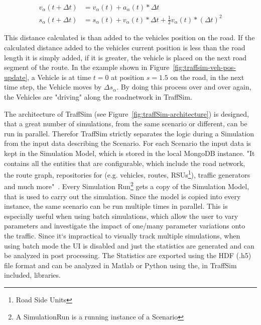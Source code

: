             \begin{align}
                v_{\alpha}(t + \Delta t) &= v_{\alpha}(t) + a_\alpha(t) * \Delta t \label{eq:numerical-integration-v} \\
                s_{\alpha}(t + \Delta t) &= s_{\alpha}(t) + v_{\alpha}(t) * \Delta t + \frac{1}{2} v_{\alpha}(t) * (\Delta t)^2 \label{eq:numerical-integration-s}
            \end{align}

            This distance calculated is than added to the vehicles position on the road.
            If the calculated distance added to the vehicles current position is less than the road length it is simply added, if it is greater, the vehicle is placed on the next road segment of the route.
            In the example shown in Figure~\ref{fig:traffsim-veh-pos-update}, a Vehicle is at time $t=0$ at position $s=1.5$ on the road, in the next time step, the Vehicle moves by $\Delta s_\alpha$.
            By doing this process over and over again, the Vehicles are "driving" along the roadnetwork in TraffSim.


            The architecture of TraffSim (see Figure~\ref{fig:traffSim-architecture}) is designed, that a great number of simulations, from the same scenario or different, can be run in parallel.
            Therefor TraffSim strictly separates the logic during a Simulation from the input data describing the Scenario.
            For each Scenario the input data is kept in the Simulation Model, which is stored in the local MongoDB instance.
            "It contains all the entities that are configurable, which include the road network, the route graph, repositories for (e.g. vehicles, routes, RSUs\footnote{Road Side Units}), traffic generators and much more"~\cite{TraffSimDoku}.
            Every Simulation Run\footnote{A SimulationRun is a running instance of a Scenario} gets a copy of the Simulation Model, that is used to carry out the simulation.
            Since the model is copied into every instance, the same scenario can be run multiple times in parallel.
            This is especially useful when using batch simulations, which allow the user to vary parameters and investigate the impact of one/many parameter variations onto the traffic.
            Since it`s impractical to visually track multiple simulations, when using batch mode the UI is disabled and just the statistics are generated and can be analyzed in post processing.
            The Statistics are exported using the HDF (.h5) file format and can be analyzed in Matlab or Python using the, in TraffSim included, libraries.

